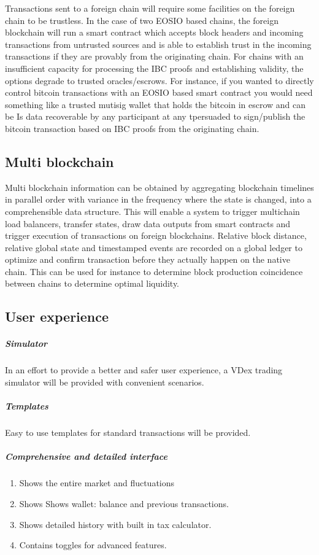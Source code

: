 \documentclass[]{article}
\begin{document}
	Transactions sent to a foreign chain will require some facilities on the foreign chain to be trustless. 
	In the case of two EOSIO based chains, the foreign blockchain will run a smart contract which accepts block headers and incoming transactions from untrusted sources and is able to establish trust in the incoming transactions if they are provably from the originating chain. 
	For chains with an insufficient capacity for processing the IBC proofs and establishing validity, the options degrade to trusted oracles/escrows.
	For instance, if you wanted to directly control bitcoin transactions with an EOSIO based smart contract you would need something like a trusted mutisig wallet that holds the bitcoin in escrow and can be 	Is data recoverable by any participant at any tpersuaded to sign/publish the bitcoin transaction based on IBC proofs from the originating chain.
	
	\subsection{Multi blockchain}
	Multi blockchain information can be obtained by aggregating blockchain timelines in parallel order with variance in the frequency where the state is changed, into a comprehensible data structure.
	This will enable a system to trigger multichain load balancers, transfer states, draw data outputs from smart contracts and trigger execution of transactions on foreign blockchains. 
	Relative block distance, relative global state and timestamped events are recorded on a
	global ledger to optimize and confirm transaction before they actually happen on the native chain.
	This can be used for instance to determine block production coincidence between chains to determine optimal liquidity.
	
	\subsection{User experience}
	\subparagraph{Simulator}
	In an effort to provide a better and safer user experience, 
	a VDex trading simulator will be provided with convenient scenarios.
	\subparagraph{Templates}
	Easy to use templates for standard transactions will be provided.
	\subparagraph{Comprehensive and detailed interface}
	\begin{enumerate}
		\item Shows the entire market and fluctuations
		\item Shows Shows wallet: balance and previous transactions.
		\item Shows detailed history with built in tax calculator.
		\item Contains toggles for advanced features.		 
	\end{enumerate}
	
\end{document}
